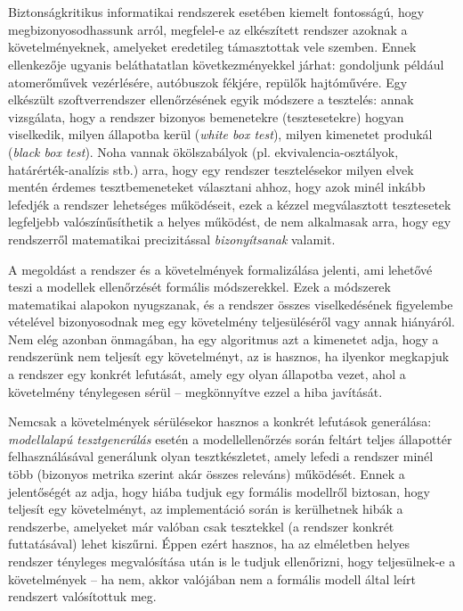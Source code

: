 
\chapter{\bevezetes}
Biztonságkritikus informatikai rendszerek esetében kiemelt fontosságú, hogy megbizonyosodhassunk arról, megfelel-e az elkészített rendszer azoknak a követelményeknek, amelyeket eredetileg támasztottak vele szemben. Ennek ellenkezője ugyanis beláthatatlan következményekkel járhat: gondoljunk például atomerőművek vezérlésére, autóbuszok fékjére, repülők hajtóművére. Egy elkészült szoftverrendszer ellenőrzésének egyik módszere a tesztelés: annak vizsgálata, hogy a rendszer bizonyos bemenetekre (tesztesetekre) hogyan viselkedik, milyen állapotba kerül (\emph{white box test}), milyen kimenetet produkál (\emph{black box test}). Noha vannak ökölszabályok (pl. ekvivalencia-osztályok, határérték-analízis stb.) arra, hogy egy rendszer tesztelésekor milyen elvek mentén érdemes tesztbemeneteket választani ahhoz, hogy azok minél inkább lefedjék a rendszer lehetséges működéseit, ezek a kézzel megválasztott tesztesetek legfeljebb valószínűsíthetik a helyes működést, de nem alkalmasak arra, hogy egy rendszerről matematikai precizitással \emph{bizonyítsanak} valamit.

A megoldást a rendszer és a követelmények formalizálása jelenti, ami lehetővé teszi a modellek ellenőrzését formális módszerekkel. Ezek a módszerek matematikai alapokon nyugszanak, és a rendszer összes viselkedésének figyelembe vételével bizonyosodnak meg egy követelmény teljesüléséről vagy annak hiányáról. Nem elég azonban önmagában, ha egy algoritmus azt a kimenetet adja, hogy a rendszerünk nem teljesít egy követelményt, az is hasznos, ha ilyenkor megkapjuk a rendszer egy konkrét lefutását, amely egy olyan állapotba vezet, ahol a követelmény ténylegesen sérül – megkönnyítve ezzel a hiba javítását.

Nemcsak a követelmények sérülésekor hasznos a konkrét lefutások generálása: \emph{modellalapú tesztgenerálás} esetén a modellellenőrzés során feltárt teljes állapottér felhasználásával generálunk olyan tesztkészletet, amely lefedi a rendszer minél több (bizonyos metrika szerint akár összes releváns) működését. Ennek a jelentőségét az adja, hogy hiába tudjuk egy formális modellről biztosan, hogy teljesít egy követelményt, az implementáció során is kerülhetnek hibák a rendszerbe, amelyeket már valóban csak tesztekkel (a rendszer konkrét futtatásával) lehet kiszűrni. Éppen ezért hasznos, ha az elméletben helyes rendszer tényleges megvalósítása után is le tudjuk ellenőrizni, hogy teljesülnek-e a követelmények -- ha nem, akkor valójában nem a formális modell által leírt rendszert valósítottuk meg.


